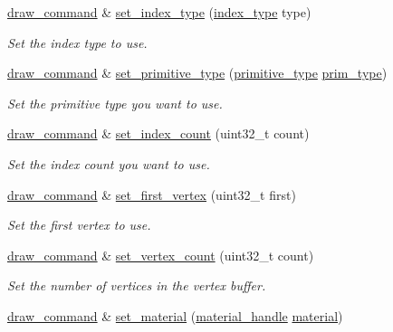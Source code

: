\begin{DoxyCompactItemize}
\mbox{\hyperlink{classmoka_1_1draw__command}{draw\+\_\+command}} \& \mbox{\hyperlink{classmoka_1_1draw__command_a230602d634bec814c10af3c145bb2a5f}{set\+\_\+index\+\_\+type}} (\mbox{\hyperlink{namespacemoka_a32244b0de63481283738e2db11639e3f}{index\+\_\+type}} type)
\begin{DoxyCompactList}\small\item\em Set the index type to use. \end{DoxyCompactList}\item 
\mbox{\hyperlink{classmoka_1_1draw__command}{draw\+\_\+command}} \& \mbox{\hyperlink{classmoka_1_1draw__command_ac2fe420afb39028cdff695fc61371aa3}{set\+\_\+primitive\+\_\+type}} (\mbox{\hyperlink{namespacemoka_a345d155429e260a6344f9c555f04ae9c}{primitive\+\_\+type}} \mbox{\hyperlink{classmoka_1_1draw__command_a360338ff71fd349287e88e96bf315e33}{prim\+\_\+type}})
\begin{DoxyCompactList}\small\item\em Set the primitive type you want to use. \end{DoxyCompactList}\item 
\mbox{\hyperlink{classmoka_1_1draw__command}{draw\+\_\+command}} \& \mbox{\hyperlink{classmoka_1_1draw__command_a4de8e124e795f7c588803db28f95f518}{set\+\_\+index\+\_\+count}} (uint32\+\_\+t count)
\begin{DoxyCompactList}\small\item\em Set the index count you want to use. \end{DoxyCompactList}\item 
\mbox{\hyperlink{classmoka_1_1draw__command}{draw\+\_\+command}} \& \mbox{\hyperlink{classmoka_1_1draw__command_af187f2784c712a95171f8089ebc33500}{set\+\_\+first\+\_\+vertex}} (uint32\+\_\+t first)
\begin{DoxyCompactList}\small\item\em Set the first vertex to use. \end{DoxyCompactList}\item 
\mbox{\hyperlink{classmoka_1_1draw__command}{draw\+\_\+command}} \& \mbox{\hyperlink{classmoka_1_1draw__command_a383256cec501b03d6e7aaa67631c7687}{set\+\_\+vertex\+\_\+count}} (uint32\+\_\+t count)
\begin{DoxyCompactList}\small\item\em Set the number of vertices in the vertex buffer. \end{DoxyCompactList}\item 
\mbox{\hyperlink{classmoka_1_1draw__command}{draw\+\_\+command}} \& \mbox{\hyperlink{classmoka_1_1draw__command_a593b24a1594565446b31d0cdbf157548}{set\+\_\+material}} (\mbox{\hyperlink{structmoka_1_1material__handle}{material\+\_\+handle}} \mbox{\hyperlink{classmoka_1_1material}{material}})

\end{DoxyCompactItemize}
